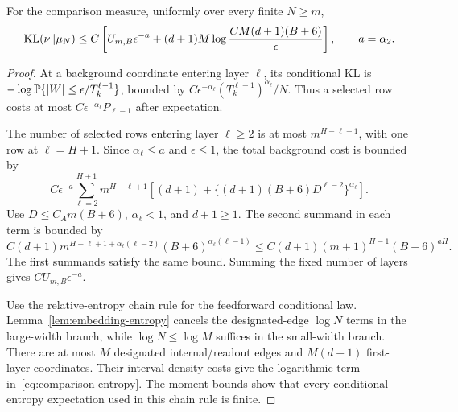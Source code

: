 \begin{lemma}\label{lem:comparison-entropy}
For the comparison measure, uniformly over every finite $N\ge m$,
\begin{equation}
 \operatorname{KL}(\nu\|\mu_N)
 \le C\left[
 U_{m,B}\epsilon^{-a}
 +(d+1)M\log\frac{CM(d+1)(B+6)}\epsilon
 \right],
 \qquad a=\alpha_2.
 \label{eq:comparison-entropy}
\end{equation}
\end{lemma}
\begin{proof}
At a background coordinate entering layer $\ell$, its conditional KL is
$-\log\mathbb P\{|W|\le\epsilon/T_k^{\ell-1}\}$, bounded by
$C\epsilon^{-\alpha_\ell}(T_k^{\ell-1})^{\alpha_\ell}/N$.
Thus a selected row costs at most $C\epsilon^{-\alpha_\ell}P_{\ell-1}$ after expectation.

The number of selected rows entering layer $\ell\ge2$ is at most $m^{H-\ell+1}$, with one row at $\ell=H+1$. Since $\alpha_\ell\le a$ and $\epsilon\le1$, the total background cost is bounded by
\[
 C\epsilon^{-a}\sum_{\ell=2}^{H+1}m^{H-\ell+1}
 \left[(d+1)+\{(d+1)(B+6)D^{\ell-2}\}^{\alpha_\ell}\right].
\]
Use $D\le C_A m(B+6)$, $\alpha_\ell<1$, and $d+1\ge1$. The second summand in each term is bounded by
\[
 C(d+1)m^{H-\ell+1+\alpha_\ell(\ell-2)}
       (B+6)^{\alpha_\ell(\ell-1)}
 \le C(d+1)(m+1)^{H-1}(B+6)^{aH}.
\]
The first summands satisfy the same bound. Summing the fixed number of layers gives $C U_{m,B}\epsilon^{-a}$.

Use the relative-entropy chain rule for the feedforward conditional law. Lemma~\ref{lem:embedding-entropy} cancels the designated-edge $\log N$ terms in the large-width branch, while $\log N\le\log M$ suffices in the small-width branch. There are at most $M$ designated internal/readout edges and $M(d+1)$ first-layer coordinates. Their interval density costs give the logarithmic term in~\eqref{eq:comparison-entropy}. The moment bounds show that every conditional entropy expectation used in this chain rule is finite.
\end{proof}

